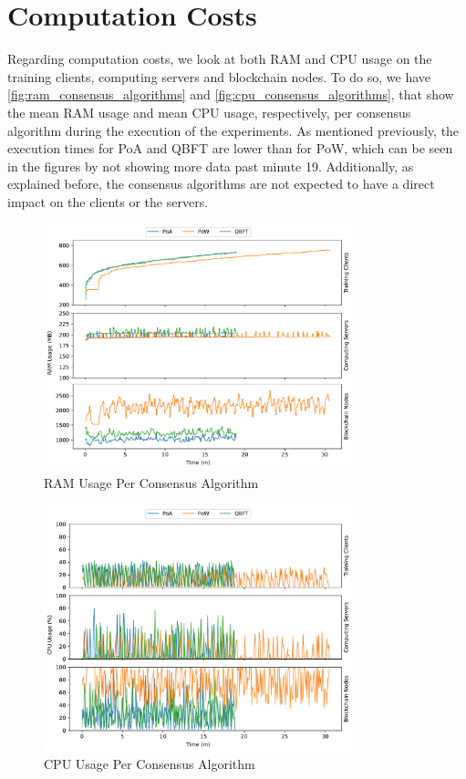 \section{Computation Costs}

Regarding computation costs, we look at both RAM and CPU usage on the training clients, computing servers and blockchain nodes. To do so, we have \autoref{fig:ram_consensus_algorithms} and \autoref{fig:cpu_consensus_algorithms}, that show the mean RAM usage and mean CPU usage, respectively, per consensus algorithm during the execution of the experiments. As mentioned previously, the execution times for PoA and QBFT are lower than for PoW, which can be seen in the figures by not showing more data past minute 19. Additionally, as explained before, the consensus algorithms are not expected to have a direct impact on the clients or the servers.

\begin{figure}[!hpt]
    \centering
    \centering
    \includegraphics[width=0.8\textwidth]{graphics/consensus/ram.pdf}
    \caption{RAM Usage Per Consensus Algorithm}
    \label{fig:ram_consensus_algorithms}
\end{figure}

\begin{figure}[!hpb]
    \centering
    \centering
    \includegraphics[width=0.8\textwidth]{graphics/consensus/cpu.pdf}
    \caption{CPU Usage Per Consensus Algorithm}
    \label{fig:cpu_consensus_algorithms}
\end{figure}

